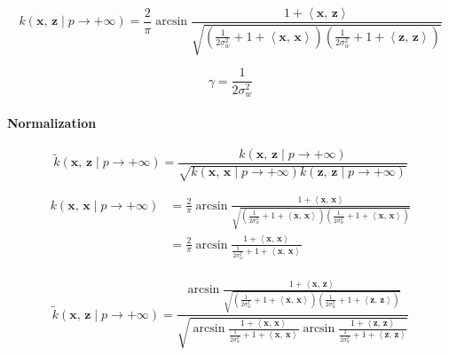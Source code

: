 \newcommand{\x}{\mathbf{x}}
\newcommand{\z}{\mathbf{z}}
\newcommand{\y}{\mathbf{y}}

\begin{equation}\label{eq:kernel_asin}
	k(\x,\,\z \mid p \to + \infty)  = \frac{2}{\pi}
	\arcsin \frac{1 + \left\langle \x,\,\z \right\rangle}{\sqrt{
			\left(
			\frac{1}{2\sigma_w^2} + 1 + \left\langle \x,\,\x \right\rangle
			\right)
			\left(
			\frac{1}{2\sigma_w^2} + 1 + \left\langle \z,\,\z \right\rangle
			\right)
		}}
\end{equation}

\begin{equation}
	\gamma = \frac{1}{2\sigma_w^2}
\end{equation}

\paragraph{Normalization}

\begin{equation}\label{eq:normalized}
	\tilde{k}(\x,\,\z \mid p \to + \infty) = \frac{
		k(\x,\,\z \mid p \to + \infty) }{
		\sqrt{
			k(\x,\,\x \mid p \to + \infty)
			k(\z,\,\z \mid p \to + \infty)
		}
	}
\end{equation}

\begin{align*}\label{eq:kernel_asin_xx}
	k(\x,\,\x \mid p \to + \infty)
	 & = \frac{2}{\pi}
	\arcsin \frac{1 + \left\langle \x,\,\x \right\rangle}{\sqrt{
			\left(
			\frac{1}{2\sigma_w^2} + 1 + \left\langle \x,\,\x \right\rangle
			\right)
			\left(
			\frac{1}{2\sigma_w^2} + 1 + \left\langle \x,\,\x \right\rangle
			\right)
	}}                 \\
	 & = \frac{2}{\pi}
	\arcsin \frac{1 + \left\langle \x,\,\x \right\rangle}{
		\frac{1}{2\sigma_w^2} + 1 + \left\langle \x,\,\x \right\rangle
	}                  \\
\end{align*}

\begin{equation}
	\tilde{k}(\x,\,\z \mid p \to + \infty) =
	\frac{
		\arcsin \frac{1 + \left\langle \x,\,\z \right\rangle}{\sqrt{
				\left(
				\frac{1}{2\sigma_w^2} + 1 + \left\langle \x,\,\x \right\rangle
				\right)
				\left(
				\frac{1}{2\sigma_w^2} + 1 + \left\langle \z,\,\z \right\rangle
				\right)
			}}
	}{
		\sqrt{
			\arcsin \frac{1 + \left\langle \x,\,\x \right\rangle}{
				\frac{1}{2\sigma_w^2} + 1 + \left\langle \x,\,\x \right\rangle
			}
			\arcsin \frac{1 + \left\langle \z,\,\z \right\rangle}{
				\frac{1}{2\sigma_w^2} + 1 + \left\langle \z,\,\z \right\rangle
			}
		}
	}
\end{equation}

